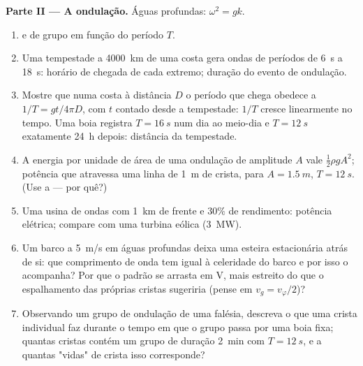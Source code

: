 \begin{problem}
\medskip
\noindent\textbf{Parte II --- A ondulação.}
Águas profundas: $\omega^2 = gk$.
\begin{enumerate}[resume]
  \item {} e de grupo em função do período $T$.
  \item Uma tempestade a \qty{4000}{km} de uma costa gera ondas de períodos
        de \qty{6}{s} a \qty{18}{s}: horário de chegada de cada extremo;
        duração do evento de ondulação.
  \item Mostre que numa costa à distância $D$ o período que chega obedece a
        $1/T = gt/4\pi D$, com $t$ contado desde a tempestade: $1/T$ cresce
        linearmente no tempo. Uma boia registra $T = \qty{16}{s}$ num dia ao meio-dia
        e $T = \qty{12}{s}$ exatamente \qty{24}{h} depois: distância da
        tempestade.
  \item A energia por unidade de área de uma ondulação de amplitude $A$ vale $\tfrac12\rho
        gA^2$; potência que atravessa uma linha de \qty{1}{m} de crista, para $A =
        \qty{1.5}{m}$, $T = \qty{12}{s}$. (Use a  --- por quê?)
  \item Uma usina de ondas com \qty{1}{km} de frente e $30\%$ de rendimento:
        potência elétrica; compare com uma turbina eólica (\qty{3}{MW}).
  \item Um barco a \qty{5}{m/s} em águas profundas deixa uma esteira estacionária
        atrás de si: que comprimento de onda tem  igual à
        celeridade do barco e por isso o acompanha? Por que o padrão se arrasta em
        V, mais estreito do que o espalhamento das próprias cristas sugeriria
        (pense em $v_g = v_\varphi/2$)?
  \item Observando um grupo de ondulação de uma falésia, descreva o que uma
        crista individual faz durante o tempo em que o grupo passa por uma
        boia fixa; quantas cristas contém um grupo de duração
        \qty{2}{min} com $T = \qty{12}{s}$, e a quantas "vidas" de crista
        isso corresponde?
\end{enumerate}


\end{problem}
